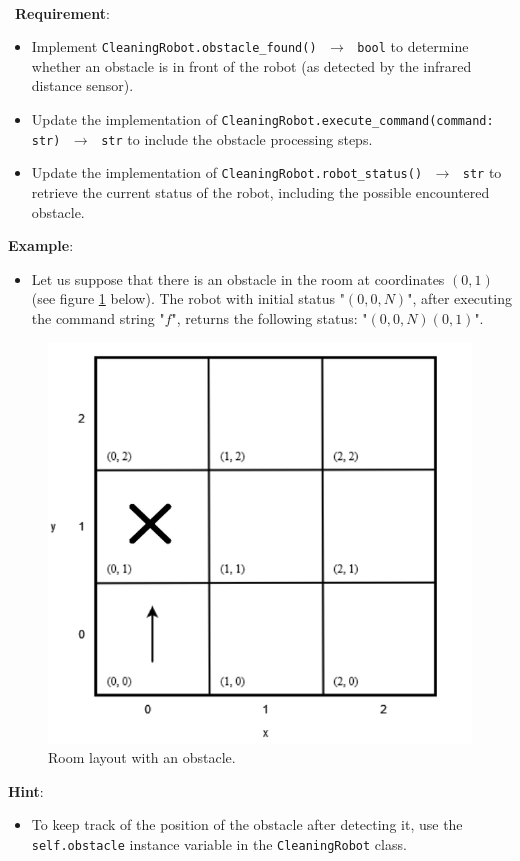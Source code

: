 \ \\ \
\noindent\textbf{Requirement}:
\begin{itemize}
    \item Implement \texttt{CleaningRobot.obstacle\_found() $\,\to\,$  bool} to determine whether an obstacle is in front of the robot (as detected by the infrared distance sensor).
    \item Update the implementation of \texttt{CleaningRobot.execute\_command(command: str) $\,\to\,$  str} to include the obstacle processing steps.
    \item Update the implementation of \texttt{CleaningRobot.robot\_status() $\,\to\,$  str} to retrieve the current status of the robot, including the possible encountered obstacle.
\end{itemize}

\noindent\textbf{Example}:
\begin{itemize}
    \item Let us suppose that there is an obstacle in the room at coordinates $(0,1)$ (see figure \ref{room_obstacle} below). The robot with initial status "$(0,0,N)$", after executing the command string "$f$", returns the following status: "$(0,0,N)(0,1)$".
\end{itemize}

\begin{figure}[H]
    \centering
    \includegraphics[width=0.5\linewidth]{figures/appendix/cleaning_robot_2.png}
    \caption{Room layout with an obstacle.}
    \label{room_obstacle}
\end{figure}

\noindent\textbf{Hint}:
\begin{itemize}
    \item To keep track of the position of the obstacle after detecting it, use the \texttt{self.obstacle} instance variable in the \texttt{CleaningRobot} class.
\end{itemize}


